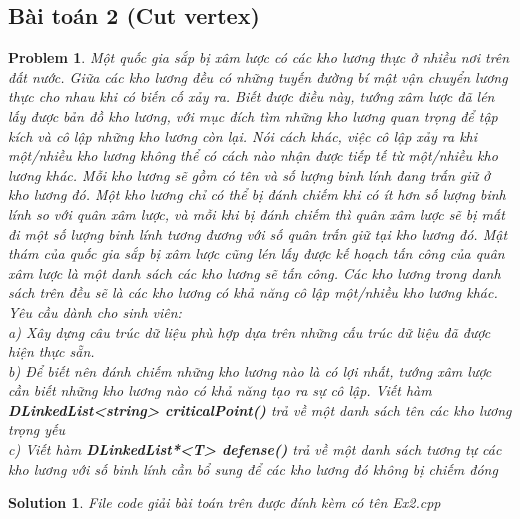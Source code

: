 \documentclass[a4paper]{article}
\newtheorem*{problem}{Problem}
\newtheorem*{sol}{Solution}
\begin{document}
    \subsection{Bài toán 2 (Cut vertex)}
    \begin{problem}
Một quốc gia sắp bị xâm lược có các kho lương thực ở nhiều nơi trên đất nước. Giữa các kho lương đều có những tuyến đường bí mật vận chuyển lương thực cho nhau khi có biến cố xảy ra. Biết được điều này, tướng xâm lược đã lén lấy được bản đồ kho lương, với mục đích tìm những kho lương quan trọng để tập kích và cô lập những kho lương còn lại. Nói cách khác, việc cô lập xảy ra khi một/nhiều kho lương không thể có cách nào nhận được tiếp tế từ một/nhiều kho lương khác. Mỗi kho lương sẽ gồm có tên và số lượng binh lính đang trấn giữ ở kho lương đó. Một kho lương chỉ có thể bị đánh chiếm khi có ít hơn số lượng binh lính so với quân xâm lược, và mỗi khi bị đánh chiếm thì quân xâm lược sẽ bị mất đi một số lượng binh lính tương đương với số quân trấn giữ tại kho lương đó. Mật thám của quốc gia sắp bị xâm lược cũng lén lấy được kế hoạch tấn công của quân xâm lược là một danh sách các kho lương sẽ tấn công. Các kho lương trong danh sách trên đều sẽ là các kho lương có khả năng cô lập một/nhiều kho lương khác. Yêu cầu dành cho sinh viên: \\
a) Xây dựng câu trúc dữ liệu phù hợp dựa trên những cấu trúc dữ liệu đã được hiện thực sẵn. \\
b) Để biết nên đánh chiếm những kho lương nào là có lợi nhất, tướng xâm lược cần biết những kho lương nào có khả năng tạo ra sự cô lập. Viết hàm \textbf{DLinkedList<string> criticalPoint()} trả về một danh sách tên các kho lương trọng yếu \\
c) Viết hàm \textbf{DLinkedList*<T> defense()} trả về một danh sách tương tự các kho lương với số binh lính cần bổ sung để các kho lương đó không bị chiếm đóng \\
    \end{problem}
    \begin{sol}
        File code giải bài toán trên được đính kèm có tên Ex2.cpp
    \end{sol}
\end{document}
